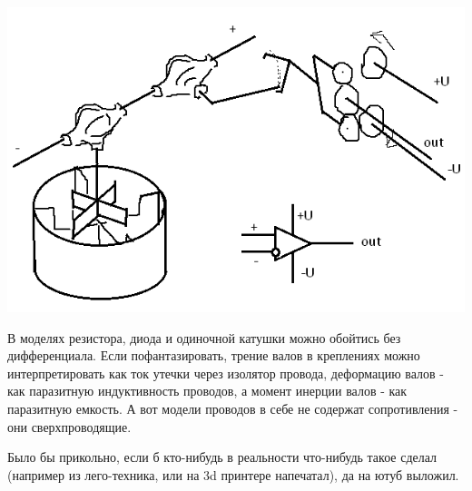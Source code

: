 \documentclass[11pt]{article} %
\begin{document}
\includegraphics{../OM.png}

В моделях резистора, диода и одиночной катушки можно обойтись без дифференциала. Если пофантазировать, трение валов в креплениях можно интерпретировать как ток утечки через изолятор провода, деформацию валов - как паразитную индуктивность проводов, а момент инерции валов - как паразитную емкость. А вот модели проводов в себе не содержат сопротивления - они сверхпроводящие.

Было бы прикольно, если б кто-нибудь в реальности что-нибудь такое сделал (например из лего-техника, или на 3d принтере напечатал), да на ютуб выложил.
\end{document}
